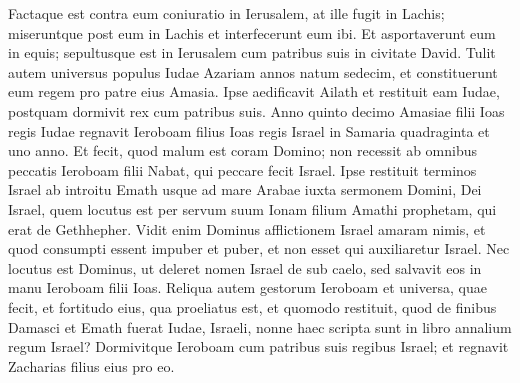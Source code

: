 \begin{biblechapter}
\verse Factaque est contra eum coniuratio in Ierusalem, at ille fugit in Lachis; miseruntque post eum in Lachis et interfecerunt eum ibi. 
\verse Et asportaverunt eum in equis; sepultusque est in Ierusalem cum patribus suis in civitate David. 
\verse Tulit autem universus populus Iudae Azariam annos natum sedecim, et constituerunt eum regem pro patre eius Amasia. 
\verse Ipse aedificavit Ailath et restituit eam Iudae, postquam dormivit rex cum patribus suis. 
\verse Anno quinto decimo Amasiae filii Ioas regis Iudae regnavit Ieroboam filius Ioas regis Israel in Samaria quadraginta et uno anno. 
\verse Et fecit, quod malum est coram Domino; non recessit ab omnibus peccatis Ieroboam filii Nabat, qui peccare fecit Israel. 
\verse Ipse restituit terminos Israel ab introitu Emath usque ad mare Arabae iuxta sermonem Domini, Dei Israel, quem locutus est per servum suum Ionam filium Amathi prophetam, qui erat de Gethhepher. 
\verse Vidit enim Dominus afflictionem Israel amaram nimis, et quod consumpti essent impuber et puber, et non esset qui auxiliaretur Israel. 
\verse Nec locutus est Dominus, ut deleret nomen Israel de sub caelo, sed salvavit eos in manu Ieroboam filii Ioas. 
\verse Reliqua autem gestorum Ieroboam et universa, quae fecit, et fortitudo eius, qua proeliatus est, et quomodo restituit, quod de finibus Damasci et Emath fuerat Iudae, Israeli, nonne haec scripta sunt in libro annalium regum Israel? 
\verse Dormivitque Ieroboam cum patribus suis regibus Israel; et regnavit Zacharias filius eius pro eo. 
\end{biblechapter}

